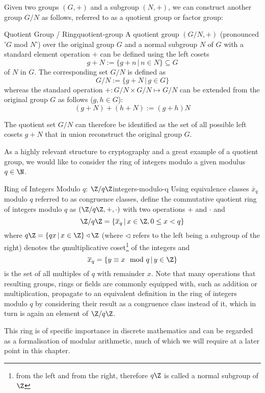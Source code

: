 Given two groups $(G, +)$ and a subgroup $(N, +)$, we can construct another group $G / N$ as follows, referred to as a quotient group or factor group:

\begin{definition}{Quotient Group / Ring}{quotient-group}
  A quotient group $(G / N, +)$ (pronounced '$G$ mod $N$') over the original group $G$ and a normal subgroup $N$ of $G$
  with a standard element operation $+$ can be defined using the left cosets
  $$g+N := \{g+n \,|\, n \in N\} \subseteq G$$ of $N$ in $G$.
  The corresponding set $G / N$ is defined as
  $$G / N := \{g + N \,|\, g \in G\}$$
  whereas the standard operation $+: G/N \times G/N \mapsto G/N$
  can be extended from the original group $G$ as follows ($g, h \in G$):
  $$(g+N) + (h+N) := (g+h)N$$
\end{definition}

The quotient set $G / N$ can therefore be identified as the set of all possible left cosets $g + N$ that in union reconstruct the original group $G$.

As a highly relevant structure to cryptography and a great example of a quotient group, we would like to consider the ring of integers modulo a given modulus $q \in \N$.

\begin{lemma}{Ring of Integers Modulo $q$: $\Z / q \Z$}{integers-modulo-q}
  Using equivalence classes $\overline{x}_q$ modulo $q$ referred to as congruence classes,
  define the commutative quotient ring of integers modulo $q$ as $(\Z / q \Z, +, \cdot)$ with
  two operations $+$ and $\cdot$ and
  $$\Z / q \Z = \{\overline{x}_q \,|\, x \in \Z, 0 \leq x < q\}$$
  where $q \Z = \{q x \,|\, x \in \Z\} \triangleleft \Z$ (where $\triangleleft$ refers to the left being a subgroup of the right) denotes the $q$\th multiplicative coset\footnote{
    from the left and from the right, therefore $q \Z$ is called a normal subgroup of $\Z$
  } of the integers and
  $$\overline{x}_q = \{y \equiv x \mod q \,|\, y \in \Z\}$$
  is the set of all multiples of $q$ with remainder $x$.
  Note that many operations that resulting groups, rings or fields are commonly equipped with,
  such as addition or multiplication, propagate to an equivalent definition in the ring of integers modulo $q$
  by considering their result as a congruence class instead of it, which in turn is again an element of $\Z / q \Z$.
\end{lemma}

This ring is of specific importance in discrete mathematics and can be regarded as a formalisation of modular arithmetic, much of which we will require at a later point in this chapter.


